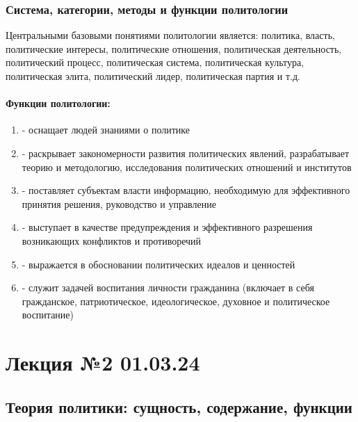 \subsection{Система, категории, методы и функции политологии}

Центральными базовыми понятиями политологии является: политика, власть, политические
интересы, политические отношения, политическая деятельность, политический процесс,
политическая система, политическая культура, политическая элита, политический лидер,
политическая партия и т.д.

\subsubsection{Функции политологии:}

\begin{enumerate}
  \item {} - оснащает людей
        знаниями о политике
  \item {} - раскрывает закономерности развития
        политических явлений, разрабатывает теорию и методологию, исследования
        политических отношений и институтов
  \item {} - поставляет субъектам власти информацию,
        необходимую для эффективного принятия решения, руководство и управление
  \item {} - выступает в качестве предупреждения и
        эффективного разрешения возникающих конфликтов и противоречий
  \item {} - выражается в обосновании политических идеалов
        и ценностей
  \item {} - служит задачей воспитания личности гражданина
        (включает в себя гражданское, патриотическое, идеологическое, духовное и
        политическое воспитание)
\end{enumerate}

\chapter{Лекция №2 01.03.24}

\section{Теория политики: сущность, содержание, функции}

